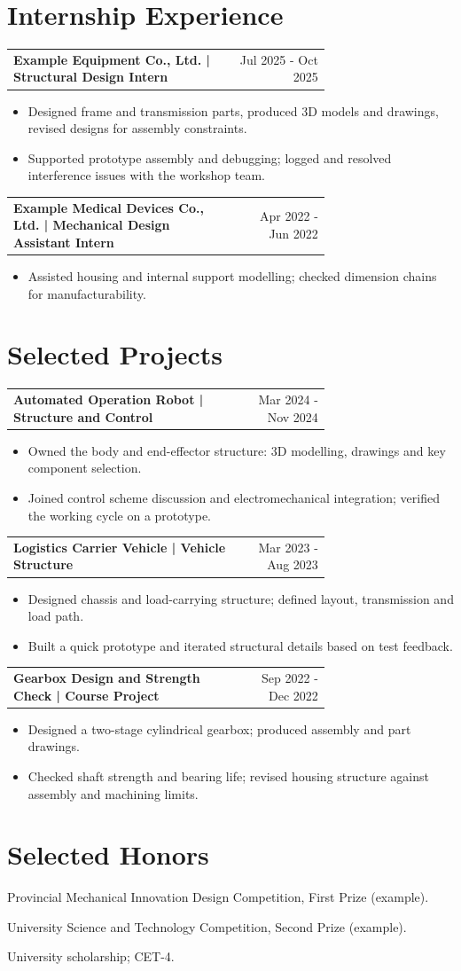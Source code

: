 \documentclass{resume}
\makeatletter
\renewcommand{\datedsubsection}[2]{\par\vspace{3pt}\noindent\begin{tabular*}{\linewidth}{@{}p{0.71\linewidth}@{\extracolsep{\fill}}r@{}}\textbf{#1}&{\small #2}\end{tabular*}\par}
\makeatother
\begin{document}
\section{Internship Experience}
\datedsubsection{Example Equipment Co., Ltd. | Structural Design Intern}{Jul 2025 - Oct 2025}
\begin{itemize}
\item Designed frame and transmission parts, produced 3D models and drawings, revised designs for assembly constraints.
\item Supported prototype assembly and debugging; logged and resolved interference issues with the workshop team.
\end{itemize}
\datedsubsection{Example Medical Devices Co., Ltd. | Mechanical Design Assistant Intern}{Apr 2022 - Jun 2022}
\begin{itemize}
\item Assisted housing and internal support modelling; checked dimension chains for manufacturability.
\end{itemize}
\section{Selected Projects}
\datedsubsection{Automated Operation Robot | Structure and Control}{Mar 2024 - Nov 2024}
\begin{itemize}
\item Owned the body and end-effector structure: 3D modelling, drawings and key component selection.
\item Joined control scheme discussion and electromechanical integration; verified the working cycle on a prototype.
\end{itemize}
\datedsubsection{Logistics Carrier Vehicle | Vehicle Structure}{Mar 2023 - Aug 2023}
\begin{itemize}
\item Designed chassis and load-carrying structure; defined layout, transmission and load path.
\item Built a quick prototype and iterated structural details based on test feedback.
\end{itemize}
\datedsubsection{Gearbox Design and Strength Check | Course Project}{Sep 2022 - Dec 2022}
\begin{itemize}
\item Designed a two-stage cylindrical gearbox; produced assembly and part drawings.
\item Checked shaft strength and bearing life; revised housing structure against assembly and machining limits.
\end{itemize}
\section{Selected Honors}
Provincial Mechanical Innovation Design Competition, First Prize (example).\par
University Science and Technology Competition, Second Prize (example).\par
University scholarship; CET-4.
\end{document}
